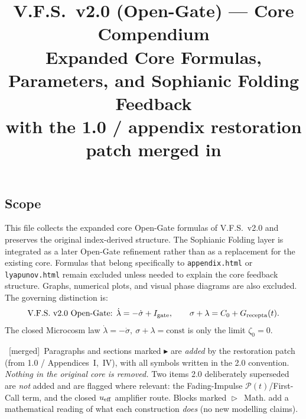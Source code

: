 \documentclass[11pt,a4paper]{article}
\title{\textbf{V.F.S.\ v2.0 (Open-Gate) --- Core Compendium}\\[0.2em]
\large Expanded Core Formulas, Parameters, and Sophianic Folding Feedback\\[0.2em]
\normalsize\textcolor{patchc}{with the 1.0 / appendix restoration patch merged in}}
\date{}
\newcommand{\padd}[1]{\par\smallskip\noindent{\color{patchc}\small$\blacktriangleright$}\ {#1}\par\smallskip}
\newcommand{\pflag}{{\footnotesize\textsf{\textcolor{patchc}{[merged]}}}}
\theoremstyle{plain}
\theoremstyle{definition}
\theoremstyle{remark}
\begin{document}
\maketitle

\subsection*{Scope}
This file collects the expanded core Open-Gate formulas of V.F.S.\ v2.0 and preserves the original
index-derived structure. The Sophianic Folding layer is integrated as a later Open-Gate refinement
rather than as a replacement for the existing core. Formulas that belong specifically to
\texttt{appendix.html} or \texttt{lyapunov.html} remain excluded unless needed to explain the core
feedback structure. Graphs, numerical plots, and visual phase diagrams are also excluded. The
governing distinction is:
\[
\text{V.F.S.\ v2.0 Open-Gate: } \dot\lambda=-\dot\sigma+I_{\rm gate},\qquad
\sigma+\lambda=C_0+G_{\rm recepta}(t).
\]
The closed Microcosm law \(\dot\lambda=-\dot\sigma,\ \sigma+\lambda=\text{const}\) is only the limit
\(\zeta_0=0\).
\padd{\pflag\ Paragraphs and sections marked \textcolor{patchc}{$\blacktriangleright$} are
\emph{added} by the restoration patch (from 1.0 / Appendices~I,~IV), with all symbols written in
the 2.0 convention. \emph{Nothing in the original core is removed.} Two items 2.0 deliberately
superseded are \emph{not} added and are flagged where relevant: the Fading-Impulse
\(\mathcal P(t)\)/First-Call term, and the closed \(u_{\rm eff}\) amplifier route. Blocks marked {\color{mathc}$\vartriangleright$}~\textsf{\textcolor{mathc}{Math.}} add a mathematical reading of what each construction \emph{does} (no new modelling claims).}

\newpage
\end{document}
